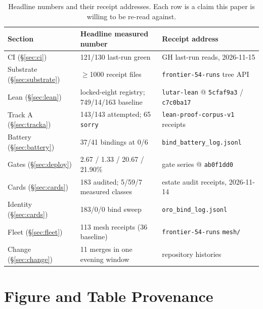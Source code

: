 \begin{table}[htbp]
\centering
\small
\begin{tabular}{lll}
\toprule
\textbf{Section} & \textbf{Headline measured number} & \textbf{Receipt address} \\
\midrule
CI (\S\ref{sec:ci}) & 121/130 last-run green & GH last-run reads, 2026-11-15 \\
Substrate (\S\ref{sec:substrate}) & $\geq$1000 receipt files & \texttt{frontier-54-runs} tree API \\
Lean (\S\ref{sec:lean}) & locked-eight registry; 749/14/163 baseline & \texttt{lutar-lean} @ \texttt{5cfaf9a3} / \texttt{c7c0ba17} \\
Track A (\S\ref{sec:tracka}) & 143/143 attempted; 65 \texttt{sorry} & \texttt{lean-proof-corpus-v1} receipts \\
Battery (\S\ref{sec:battery}) & 37/41 bindings at 0/6 & \texttt{bind\_battery\_log.jsonl} \\
Gates (\S\ref{sec:deploy}) & 2.67 / 1.33 / 20.67 / 21.90\% & gate series @ \texttt{ab0f1dd0} \\
Cards (\S\ref{sec:cards}) & 183 audited; 5/59/7 measured classes & estate audit receipts, 2026-11-14 \\
Identity (\S\ref{sec:cards}) & 183/0/0 bind sweep & \texttt{oro\_bind\_log.jsonl} \\
Fleet (\S\ref{sec:fleet}) & 113 mesh receipts (36 baseline) & \texttt{frontier-54-runs} \texttt{mesh/} \\
Change (\S\ref{sec:change}) & 11 merges in one evening window & repository histories \\
\bottomrule
\end{tabular}
\caption{Headline numbers and their receipt addresses. Each row is a claim this paper is willing to be re-read against.}
\label{tab:recap}
\end{table}

\appendix
\section{Figure and Table Provenance}
\label{app:provenance}

